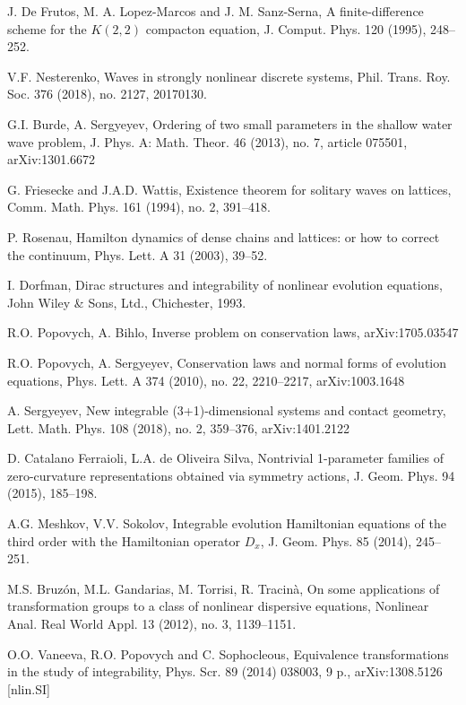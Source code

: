 \documentclass[12pt]{article}
\begin{document}
\begin{thebibliography}{99}
J. De Frutos,  M. A. Lopez-Marcos and J. M. Sanz-Serna,
A finite-difference scheme for the $K(2,2)$ compacton equation, J. Comput. Phys.
  {120}  (1995), 248--252.

V.F. Nesterenko, Waves in strongly nonlinear discrete systems, Phil. Trans. Roy. Soc. 376 (2018),
no. 2127, 20170130.

G.I. Burde, A. Sergyeyev,
Ordering of two small parameters in the shallow water wave problem, J. Phys. A: Math. Theor. 46 (2013), no. 7, article 075501, arXiv:1301.6672



G. Friesecke and J.A.D. Wattis, Existence theorem for solitary waves on lattices, Comm. Math. Phys.   161 (1994), no. 2, 391--418.

P. Rosenau, Hamilton dynamics of dense chains and lattices: or how to correct the continuum, Phys. Lett. A 31 (2003), 39--52.

I.  Dorfman, Dirac structures and integrability of nonlinear evolution equations,
John Wiley \& Sons, Ltd., Chichester, 1993.

R.O. Popovych, A. Bihlo, Inverse problem on conservation laws,  arXiv:1705.03547

R.O.  Popovych, A. Sergyeyev, Conservation laws and normal forms of evolution equations, Phys. Lett. A 374 (2010), no. 22, 2210--2217,  arXiv:1003.1648

A. Sergyeyev, New  integrable (3+1)-dimensional systems and contact geometry, Lett. Math. Phys. 108 (2018), no. 2, 359--376, arXiv:1401.2122

D. Catalano Ferraioli, L.A. de Oliveira Silva, Nontrivial 1-parameter families of zero-curvature representations obtained via symmetry actions, J. Geom. Phys. 94 (2015), 185--198.

A.G. Meshkov, V.V. Sokolov, Integrable evolution Hamiltonian equations of the third order with the Hamiltonian operator $D_x$, J. Geom. Phys. 85 (2014), 245--251.


 M.S. Bruz\'on, M.L. Gandarias, M. Torrisi, R. Tracin\`a, On some applications of transformation groups to a class of nonlinear dispersive equations, Nonlinear Anal. Real World Appl. 13 (2012), no. 3, 1139--1151.

O.O. Vaneeva, R.O. Popovych and C. Sophocleous, Equivalence transformations in the study of integrability, Phys. Scr. 89 (2014) 038003, 9 p., arXiv:1308.5126 [nlin.SI]


\end{thebibliography}
\end{document}
